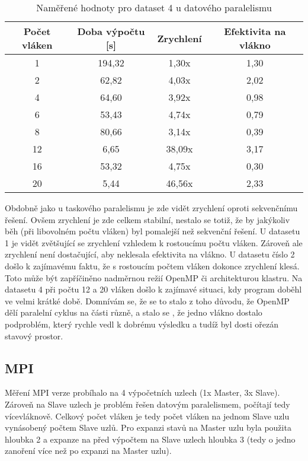 \documentclass[a4paper,10pt]{article}
\begin{document}
\begin{table}[H]
\centering
\begin{tabular}{|c|c|c|c|}
\hline
Počet vláken & Doba výpočtu {[}s{]} & Zrychlení & Efektivita na vlákno \\ \hline
1            & 194,32               & 1,30x     & 1,30                 \\
2            & 62,82                & 4,03x     & 2,02                 \\
4            & 64,60                & 3,92x     & 0,98                 \\
6            & 53,43                & 4,74x     & 0,79                 \\
8            & 80,66                & 3,14x     & 0,39                 \\
12           & 6,65                 & 38,09x    & 3,17                 \\
16           & 53,32                & 4,75x     & 0,30                 \\
20           & 5,44                 & 46,56x    & 2,33                 \\ \hline
\end{tabular}
\caption{Naměřené hodnoty pro dataset 4 u datového paralelismu}
\end{table}

Obdobně jako u taskového paralelismu je zde vidět zrychlení oproti sekvenčnímu řešení. Ovšem zrychlení je zde celkem stabilní, nestalo se totiž, že by jakýkoliv běh (při libovolném počtu vláken) byl pomalejší než sekvenční řešení. U datasetu 1 je vidět zvětšující se zrychlení vzhledem k rostoucímu počtu vláken. Zároveň ale zrychlení není dostačující, aby neklesala efektivita na vlákno. U datasetu číslo 2 došlo k zajímavému faktu, že s rostoucím počtem vláken dokonce zrychlení klesá. Toto může být zapříčiněno nadměrnou režií OpenMP či architekturou klastru. Na datasetu 4 při počtu 12 a 20 vláken došlo k zajímavé situaci, kdy program doběhl ve velmi krátké době. Domnívám se, že se to stalo z toho důvodu, že OpenMP dělí paralelní cyklus na části různě, a stalo se , že jedno vlákno dostalo podproblém, který rychle vedl k dobrému výsledku a tudíž byl dosti ořezán stavový prostor.

\subsection*{MPI}
Měření MPI verze probíhalo na 4 výpočetních uzlech (1x Master, 3x Slave). Zároveň na Slave uzlech je problém řešen datovým paralelismem, počítají tedy vícevláknově. Celkový počet vláken je tedy počet vláken na jednom Slave uzlu vynásobený počtem Slave uzlů. Pro expanzi stavů na Master uzlu byla použita hloubka 2 a expanze na před výpočtem na Slave uzlech hloubka 3 (tedy o jedno zanoření více než po expanzi na Master uzlu).
\end{document}
